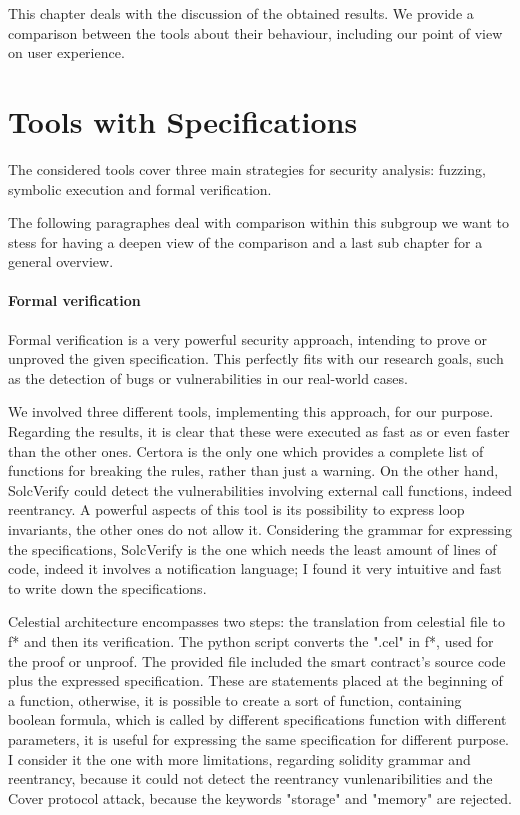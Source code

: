 This chapter deals with the discussion of the obtained results. 
We provide a comparison between the tools about their behaviour, including our point of view on user experience. 
\section{Tools with Specifications}
The considered tools cover three main strategies for security analysis: fuzzing, symbolic execution and formal verification. 

The following paragraphes deal with comparison within this subgroup we want to stess for having a deepen view of the comparison and a last sub chapter for a general overview.

\paragraph{Formal verification} 
Formal verification is a very powerful security approach, intending to prove or unproved the given specification. 
This perfectly fits with our research goals, such as the detection of bugs or vulnerabilities in our real-world cases. 

We involved three different tools, implementing this approach, for our purpose. Regarding the results, it is clear that these were executed as fast as or even faster than the other ones. 
Certora is the only one which provides a complete list of functions for breaking the rules, rather than just a warning. 
On the other hand, SolcVerify could detect the vulnerabilities involving external call functions, indeed reentrancy. A powerful aspects of this tool is its possibility to express 
loop invariants, the other ones do not allow it.
Considering the grammar for expressing the specifications, SolcVerify is the one which needs the least amount of lines of code, indeed it involves a notification language; 
I found it very intuitive and fast to write down the specifications.

Celestial architecture encompasses two steps: the translation from celestial file to f* and then its verification. The python script converts the ".cel" in f*, used for the proof or unproof.
The provided file included the smart contract's source code plus the expressed specification. These are statements placed at the beginning of a function, otherwise, it is possible to create a sort of function, 
containing boolean formula, which is called by different specifications function with different parameters, it is useful for expressing the same specification for different purpose.  I consider it the one with more limitations, regarding solidity grammar and reentrancy, 
because it could not detect the reentrancy vunlenaribilities and the Cover protocol attack, because the keywords "storage" and "memory" are rejected. 

